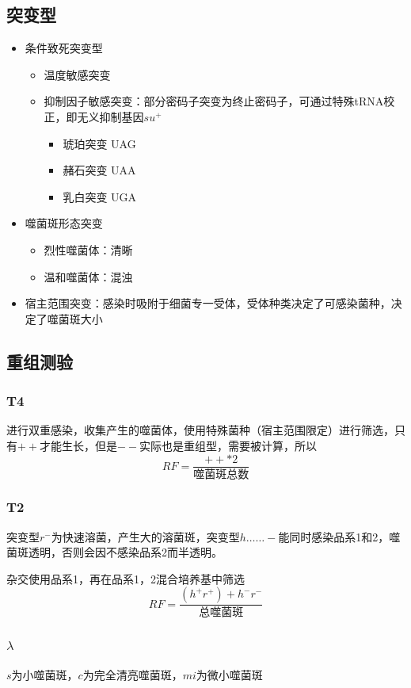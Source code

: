 \documentclass[a4paper, 12pt]{report}
\begin{document}
\subsection{突变型}
\begin{itemize}
    \item 条件致死突变型
          \begin{itemize}
              \item 温度敏感突变
              \item 抑制因子敏感突变：部分密码子突变为终止密码子，可通过特殊tRNA校正，即无义抑制基因\(su^+\)\begin{itemize}
                        \item 琥珀突变 UAG
                        \item 赭石突变 UAA
                        \item 乳白突变 UGA
                    \end{itemize}
          \end{itemize}
    \item 噬菌斑形态突变
          \begin{itemize}
              \item 烈性噬菌体：清晰
              \item 温和噬菌体：混浊
          \end{itemize}
    \item 宿主范围突变：感染时吸附于细菌专一受体，受体种类决定了可感染菌种，决定了噬菌斑大小
\end{itemize}
\subsection{重组测验}
\subsubsection{T4}
进行双重感染，收集产生的噬菌体，使用特殊菌种（宿主范围限定）进行筛选，只有\(++\)才能生长，但是\(--\)实际也是重组型，需要被计算，所以
\[
    RF=\dfrac{++*2}{\text{噬菌斑总数}}
\]
\subsubsection{T2}
突变型\(r^-\)为快速溶菌，产生大的溶菌斑，突变型\(h……-\)能同时感染品系1和2，噬菌斑透明，否则会因不感染品系2而半透明。

杂交使用品系1，再在品系1，2混合培养基中筛选
\[
    RF=\dfrac{(h^+r^+)+{h^-r^-}}{\text{总噬菌斑}}
\]
\subsubsection{\(\lambda\)}
\(s\)为小噬菌斑，\(c\)为完全清亮噬菌斑，\(mi\)为微小噬菌斑
\end{document}
